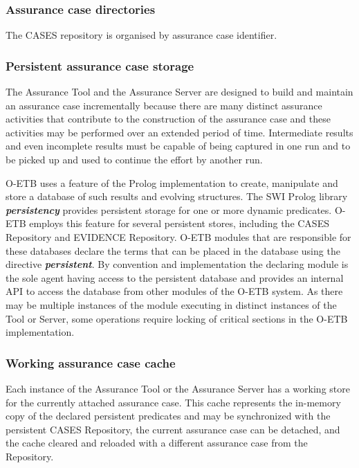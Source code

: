 \documentclass[12pt,twoside,a4paper]{article}
\begin{document}
\hypertarget{assurance-case-directories}{%
\subsubsection{Assurance case directories}\label{assurance-case-directories}}

The CASES repository is organised by assurance case identifier.

\hypertarget{persistent-assurance-case-storage}{%
\subsubsection{Persistent assurance case storage}\label{persistent-assurance-case-storage}}

The Assurance Tool and the Assurance Server are designed to build and maintain an assurance case incrementally because there are many distinct assurance activities that contribute to the construction of the assurance case and these activities may be performed over an extended period of time. Intermediate results and even incomplete results must be capable of being captured in one run and to be picked up and used to continue the effort by another run.

O-ETB uses a feature of the Prolog implementation to create, manipulate and store a database of such results and evolving structures. The SWI Prolog library \emph{\textbf{persistency}} provides persistent storage for one or more dynamic predicates. O-ETB employs this feature for several persistent stores, including the CASES Repository and EVIDENCE Repository. O-ETB modules that are responsible for these databases declare the terms that can be placed in the database using the directive \emph{\textbf{persistent}}. By convention and implementation the declaring module is the sole agent having access to the persistent database and provides an internal API to access the database from other modules of the O-ETB system. As there may be multiple instances of the module executing in distinct instances of the Tool or Server, some operations require locking of critical sections in the O-ETB implementation.

\hypertarget{working-assurance-case-cache}{%
\subsubsection{Working assurance case cache}\label{working-assurance-case-cache}}

Each instance of the Assurance Tool or the Assurance Server has a working store for the currently attached assurance case. This cache represents the in-memory copy of the declared persistent predicates and may be synchronized with the persistent CASES Repository, the current assurance case can be detached, and the cache cleared and reloaded with a different assurance case from the Repository.
\end{document}
